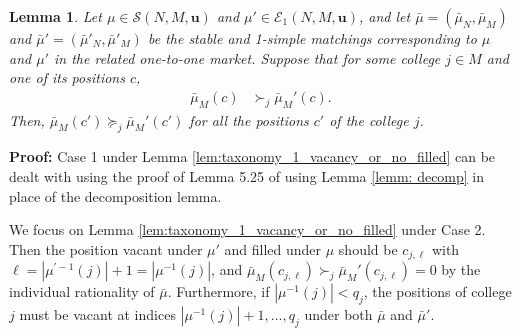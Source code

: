 \documentclass[12pt, fullpage]{amsart}
\newtheorem{lemma}{Lemma}[section]
\theoremstyle{definition}
\theoremstyle{definition}
\theoremstyle{definition}
\begin{document}
\begin{bibunit}[econometrica]
\begin{lemma}
	\label{lem:RS5pt25}
	Let $\mu\in\mathcal{S}(N,M,\boldsymbol{u})$
	and $\mu'\in\mathcal{E}_1(N,M,\boldsymbol{u})$, and let $\bar{\mu}=(\bar{\mu}_{N},\bar{\mu}_{M})$
	and $\bar{\mu}'=(\bar{\mu}'_{N},\bar{\mu}'_{M})$ be the stable and
	1-simple matchings corresponding to $\mu$ and $\mu'$ in the related
	one-to-one market. Suppose that for some college $j \in M$ and one of its positions $c$,
	\begin{align}
		\label{ineq2}
		\bar{\mu}_{M}(c) &\succ_{j}\bar{\mu}_{M}'(c).
	\end{align}
	Then, $\bar{\mu}_{M}(c')\succeq_{j}\bar{\mu}_{M}'(c')$
	for all the positions $c'$ of the college $j$.
\end{lemma}

\noindent \textbf{Proof:}
Case 1 under  Lemma \ref{lem:taxonomy_1_vacancy_or_no_filled} can be dealt with using the proof of Lemma 5.25 of \cite{Roth/Sotomayor:90:TwoSidedMatching} using Lemma \ref{lemm: decomp} in place of the decomposition lemma.

We focus on Lemma \ref{lem:taxonomy_1_vacancy_or_no_filled} under Case 2. Then the position vacant under $\mu'$ and filled under $\mu$ should be $c_{j,\ell}$ with $\ell = |\mu^{\prime -1}(j)|+1 = |\mu^{-1}(j)|$, and $\bar \mu_M(c_{j,\ell}) \succ_j \bar \mu_M'(c_{j,\ell}) = 0$ by the individual rationality of $\bar \mu$. Furthermore, if $|\mu^{-1}(j)|<q_{j}$, the positions of college $j$ must be vacant at indices $|\mu^{-1}(j)|+1,...,q_{j}$ under both $\bar{\mu}$ and $\bar{\mu}'$. 


\end{bibunit}
\end{document}
